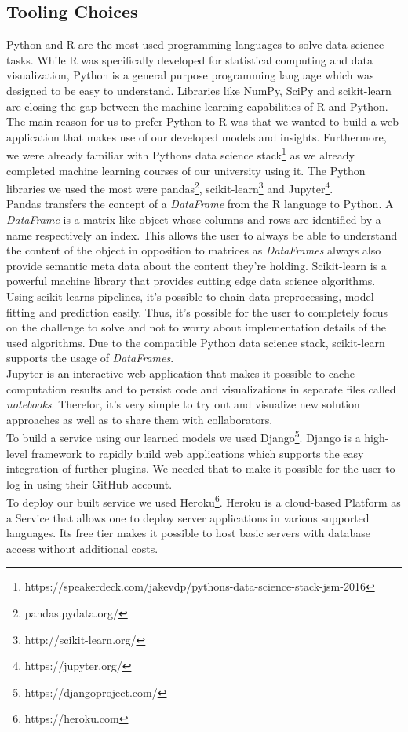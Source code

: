 \documentclass[%
a4paper,
DIV12,
2.5headlines,
bigheadings,
titlepage,
openbib,
]{scrartcl}
\begin{document}
\subsection{Tooling Choices}\label{tooling-choices}
Python and R are the most used programming languages to solve data science tasks.
While R was specifically developed for statistical computing and data visualization, Python is a general purpose programming language which was designed to be easy to understand.
Libraries like NumPy, SciPy and scikit-learn are closing the gap between the machine learning capabilities of R and Python.
The main reason for us to prefer Python to R was that we wanted to build a web application that makes use of our developed models and insights.
Furthermore, we were already familiar with Pythons data science stack\footnote{https://speakerdeck.com/jakevdp/pythons-data-science-stack-jsm-2016} as we already completed machine learning courses of our university using it.
The Python libraries we used the most were pandas\footnote{pandas.pydata.org/}, scikit-learn\footnote{http://scikit-learn.org/} and Jupyter\footnote{https://jupyter.org/}.\\
Pandas transfers the concept of a \textit{DataFrame} from the R language to Python.
A \textit{DataFrame} is a matrix-like object whose columns and rows are identified by a name respectively an index.
This allows the user to always be able to understand the content of the object in opposition to matrices as \textit{DataFrames} always also provide semantic meta data about the content they're holding.
Scikit-learn is a powerful machine library that provides cutting edge data science algorithms.
Using scikit-learns pipelines, it's possible to chain data preprocessing, model fitting and prediction easily.
Thus, it's possible for the user to completely focus on the challenge to solve and not to worry about implementation details of the used algorithms.
Due to the compatible Python data science stack, scikit-learn supports the usage of \textit{DataFrames}.\\
Jupyter is an interactive web application that makes it possible to cache computation results and to persist code and visualizations in separate files called \textit{notebooks}.
Therefor, it's very simple to try out and visualize new solution approaches as well as to share them with collaborators.\\
To build a service using our learned models we used Django\footnote{https://djangoproject.com/}.
Django is a high-level framework to rapidly build web applications which supports the easy integration of further plugins.
We needed that to make it possible for the user to log in using their GitHub account.\\
To deploy our built service we used Heroku\footnote{https://heroku.com}.
Heroku is a cloud-based Platform as a Service that allows one to deploy server applications in various supported languages.
Its free tier makes it possible to host basic servers with database access without additional costs.
\end{document}
